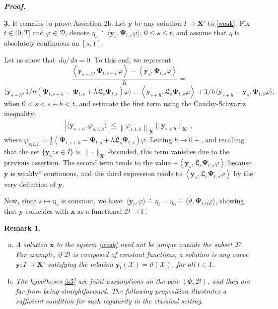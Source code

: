 \documentclass[sn-mathphys-num]{sn-jnl}
\numberwithin{equation}{section}
\theoremstyle{mythm}
\theoremstyle{mydef}
\newtheorem{remark}[proposition]{Remark}
\renewenvironment{proof}{\smallskip\noindent\emph{\textbf{Proof.}}%
  \hspace{1pt}}{\hspace{-5pt}{\nobreak\quad\nobreak\hfill\nobreak%
    $\square$\vspace{2pt}\par}\smallskip\goodbreak}
\renewcommand{\phi}{\varphi}
\renewcommand{\d}{\,d}
\newcommand{\F}{\mathbb F}
\begin{document}
\begin{proof}
   \smallskip

   \textbf{3.} It remains to prove Assertion 2b. Let \( \bm y \) be any solution \( I \to \bm X' \) to \eqref{weak}. Fix \( t \in (0,T] \) and \( \phi \in \bm{\mathcal D} \), denote \( \eta_s \doteq \langle \bm y_s, \bm \Psi_{t,s} \phi \rangle \), \( 0 \leq s \leq t \), and assume that \( \eta \) is absolutely continuous on \( [s, T] \). 
    
Let us show that \( \d \eta / \d s = 0 \). To this end, we represent:
    \[
      \frac{\left\langle \bm y_{s+h}, \bm \Psi_{t, s+h} \phi\right\rangle - \left\langle \bm y_s, \bm \Psi_{t,s} \phi\right\rangle}{h} =
      \]
      \[
      \big\langle \bm y_{s+h}, 1/h\left(\bm \Psi_{t,s+h} - \bm \Psi_{t,s} + h \mathfrak L_s \bm \Psi_{t, s}\right) \phi\big\rangle - \left\langle \bm y_{s+h}, \mathfrak L_s \bm \Psi_{t, s} \phi \right\rangle  +  1/h\langle \bm y_{s+h} - \bm y_s, \bm \Psi_{t,s} \phi\rangle,
    \]
when \( 0 < s < s+h < t \), and estimate the first term using the Cauchy-Schwartz inequality:
    \begin{align*}
        \left|\big\langle \bm y_{s+h}, \phi_{s,t,h}\big\rangle\right| \leq \left\|\phi_{s,t,h}\right\|_{\bm X}\|\bm y_{s+h}\|_{\bm X'},
    \end{align*}
    where \( \phi_{s,t,h} \doteq \frac{1}{h}\left(\bm \Psi_{t,s+h} - \bm \Psi_{t,s}   + h \mathfrak L_s \bm \Psi_{t, s}\right) \phi \).
      Letting \( h \to 0+ \), and recalling that the set \( \{\bm y_s\colon s \in I\} \) is \( \|\cdot\|_{\bm X'} \)-bounded, this term
     vanishes due to the previous assertion. The second term tends to the value \(-\left\langle \bm y_{s},\mathfrak L_s \bm \Psi_{t, s} \phi \right\rangle\) because \( \bm y \) is weakly* continuous, and the third expression tends to \( \left\langle \bm y_{s},\mathfrak L_s \bm \Psi_{t, s} \phi \right\rangle \) by the very definition of \( \bm y \). 
    
    Now, since \( s \mapsto \eta_s \) is constant, we have:
\(
    \langle \bm y_t, \phi \rangle \doteq \eta_t = \eta_0 \doteq \langle \vartheta , \bm \Psi_{t,0} \phi \rangle
\),
showing that \( \bm y \) coincides with \( \bm x \) as a functional \( \bm{\mathcal D} \to \F \).

\end{proof}
 

\begin{remark}\label{rem:a}
~
\begin{enumerate}[(a)]
    \item 
A solution $\bm x$ to the system \eqref{weak} need not be unique outside the subset \( \bm{\mathcal D} \). For example, if \( \bm{\mathcal D} \) is composed of constant functions, a solution is any curve \( \bm{y}\colon I \to  \bm X'\) satisfying the relation \( \bm{y}_t(\mathcal{X}) = \vartheta(\mathcal{X}) \), for all \( t \in I \).

\item The hypotheses \ref{a5} are joint assumptions on the pair \( (\Phi, \bm{\mathcal D}) \), and they are far from being straightforward. The following proposition illustrates a sufficient condition for such regularity in the classical setting. 
\end{enumerate}
\end{remark}
\end{document}
